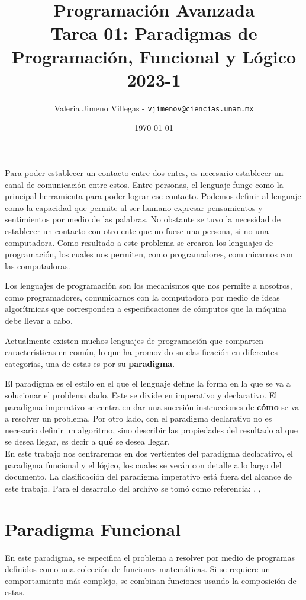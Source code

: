 \documentclass[12pt, oneside]{article}
\title{Programación Avanzada \\[5pt] \normalsize Tarea 01: Paradigmas de Programación, Funcional y Lógico \\[5pt] 2023-1}
\author{Valeria Jimeno Villegas - \texttt{vjimenov@ciencias.unam.mx}}
\date{\today}
\begin{document}
\maketitle

Para poder establecer un contacto entre dos entes, es necesario establecer un canal de comunicación entre estos. 
Entre personas, el lenguaje funge como la principal herramienta para poder lograr ese contacto. Podemos definir al lenguaje como la capacidad que permite al ser humano expresar pensamientos y sentimientos por medio de las palabras. No obstante se tuvo la necesidad de establecer un contacto con otro ente que no fuese una persona, si no una computadora. Como resultado a este problema se crearon los lenguajes de programación, los cuales nos permiten, como programadores, comunicarnos con las computadoras.

Los lenguajes de programación son los mecanismos que nos permite a nosotros, como programadores, comunicarnos con la computadora por medio de ideas algorítmicas que corresponden a especificaciones de cómputos que la máquina debe llevar a cabo\cite{javo_notas}.

Actualmente existen muchos lenguajes de programación que comparten características en común, lo que ha promovido su clasificación en diferentes categorías, una de estas es por su {\bf paradigma}.

El paradigma es el estilo en el que el lenguaje define la forma en la que se va a solucionar el problema dado. Este se divide en imperativo y declarativo. El paradigma imperativo se centra en dar una sucesión instrucciones de {\bf cómo} se va a resolver un problema. Por otro lado, con el paradigma declarativo no es necesario definir un algoritmo, sino describir las propiedades del resultado al que se desea llegar, es decir a {\bf qué} se desea llegar.\\

En este trabajo nos centraremos en dos vertientes del paradigma declarativo, el paradigma funcional y el lógico, los cuales se verán con detalle a lo largo del documento. La clasificación del paradigma imperativo está fuera del alcance de este trabajo. Para el desarrollo del archivo se tomó como referencia: \cite{javo_notas}, \cite{favio_notas}, 


\section*{Paradigma Funcional}

En este paradigma, se especifica el problema a resolver por medio de programas definidos como una colección de funciones matemáticas. Si se requiere un comportamiento más complejo, se combinan funciones usando la composición de estas. 
\end{document}
